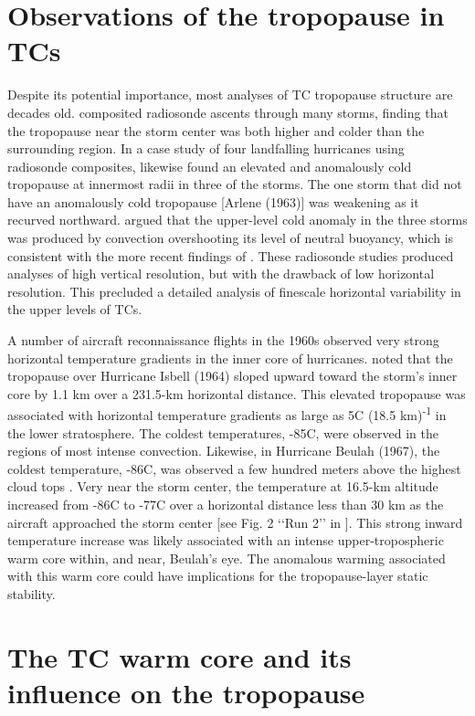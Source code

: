 \section{Observations of the tropopause in TCs}
Despite its potential importance, most analyses of TC tropopause structure are decades old.
\cite{JordanJordan1954} composited radiosonde ascents through many storms, finding that the tropopause near the storm center was both higher and colder than the surrounding region.
In a case study of four landfalling hurricanes using radiosonde composites, \cite{Koteswaram1967} likewise found an elevated and anomalously cold tropopause at innermost radii in three of the storms.
The one storm that did not have an anomalously cold tropopause [Arlene (1963)] was weakening as it recurved northward.
\cite{Koteswaram1967} argued that the upper-level cold anomaly in the three storms was produced by convection overshooting its level of neutral buoyancy, which is consistent with the more recent findings of \cite{Davisetal2014}.
These radiosonde studies produced analyses of high vertical resolution, but with the drawback of low horizontal resolution.
This precluded a detailed analysis of finescale horizontal variability in the upper levels of TCs.

A number of aircraft reconnaissance flights in the 1960s observed very strong horizontal temperature gradients in the inner core of hurricanes.
\cite{Penn1966} noted that the tropopause over Hurricane Isbell (1964) sloped upward toward the storm’s inner core by 1.1 km over a 231.5-km horizontal distance.
This elevated tropopause was associated with horizontal temperature gradients as large as 5\textdegree{}C (18.5 km)\textsuperscript{-1} in the lower stratosphere.
The coldest temperatures, -85\textdegree{}C, were observed in the regions of most intense convection.
Likewise, in Hurricane Beulah (1967), the coldest temperature, -86\textdegree{}C, was observed a few hundred meters above the highest cloud tops \citep{Waco1970}.
Very near the storm center, the temperature at 16.5-km altitude increased from -86\textdegree{}C to -77\textdegree{}C over a horizontal distance less than 30 km as the aircraft approached the storm center [see Fig. 2 ‘‘Run 2’’ in \cite{Waco1970}].
This strong inward temperature increase was likely associated with an intense upper-tropospheric warm core within, and near, Beulah’s eye.
The anomalous warming associated with this warm core could have implications for the tropopause-layer static stability.

\section{The TC warm core and its influence on the tropopause}

